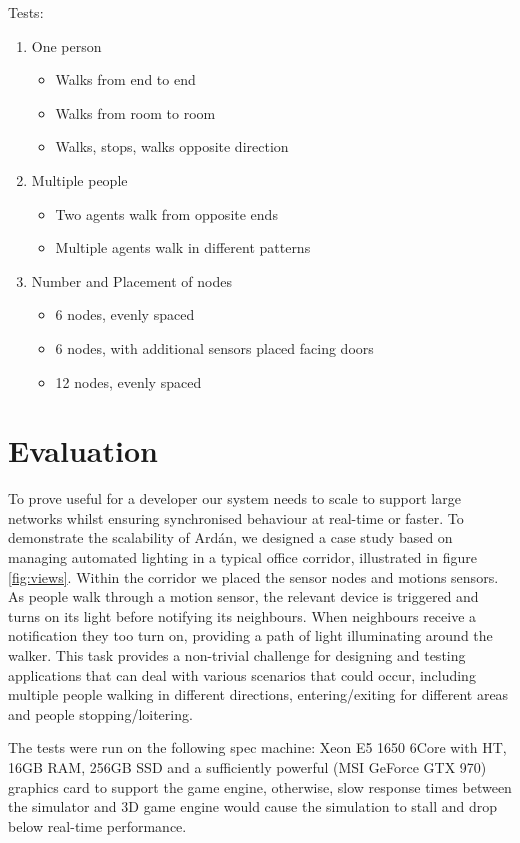 Tests:
\begin{enumerate}
  \item One person
    \begin{itemize}
      \item Walks from end to end
      \item Walks from room to room
      \item Walks, stops, walks opposite direction
    \end{itemize}
  \item Multiple people
  \begin{itemize}
    \item Two agents walk from opposite ends
    \item Multiple agents walk in different patterns
  \end{itemize}
  \item Number and Placement of nodes
  \begin{itemize}
    \item 6 nodes, evenly spaced
    \item 6 nodes, with additional sensors placed facing doors
    \item 12 nodes, evenly spaced
  \end{itemize}
\end{enumerate}



\section{Evaluation}
To prove useful for a developer our system needs to scale to support large networks whilst ensuring synchronised behaviour at real-time or faster. To demonstrate the scalability of Ard\'{a}n, we designed a case study based on managing automated lighting in a typical office corridor, illustrated in figure \ref{fig:views}. Within the corridor we placed the sensor nodes and motions sensors. As people walk through a motion sensor, the relevant device is triggered and turns on its light before notifying its neighbours. When neighbours receive a notification they too turn on, providing a path of light illuminating around the walker. This task provides a non-trivial challenge for designing and testing applications that can deal with various scenarios that could occur, including multiple people walking in different directions, entering/exiting for different areas and people stopping/loitering.

The tests were run on the following spec machine: Xeon E5 1650 6Core with HT, 16GB RAM, 256GB SSD and a sufficiently powerful (MSI GeForce GTX 970) graphics card to support the game engine, otherwise, slow response times between the simulator and 3D game engine would cause the simulation to stall and drop below real-time performance.

